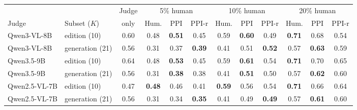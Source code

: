 \begin{tabular}{llc|ccc|ccc|ccc}
\toprule
 & & Judge & \multicolumn{3}{c|}{5\% human} & \multicolumn{3}{c|}{10\% human} & \multicolumn{3}{c}{20\% human}\\
Judge & Subset ($K$) & only & Hum. & PPI & PPI-r & Hum. & PPI & PPI-r & Hum. & PPI & PPI-r\\
\midrule
Qwen3-VL-8B & edition (10) & 0.60 & 0.48 & \textbf{0.51} & 0.45 & 0.59 & \textbf{0.60} & 0.49 & \textbf{0.71} & 0.68 & 0.54\\
Qwen3-VL-8B & generation (21) & 0.56 & 0.31 & 0.37 & \textbf{0.39} & 0.41 & 0.51 & \textbf{0.52} & 0.57 & \textbf{0.63} & 0.59\\
Qwen3.5-9B & edition (10) & 0.64 & 0.48 & \textbf{0.53} & 0.45 & 0.59 & \textbf{0.61} & 0.54 & \textbf{0.71} & 0.70 & 0.65\\
Qwen3.5-9B & generation (21) & 0.56 & 0.31 & \textbf{0.38} & 0.38 & 0.41 & \textbf{0.51} & 0.50 & 0.57 & \textbf{0.62} & 0.60\\
Qwen2.5-VL-7B & edition (10) & 0.47 & \textbf{0.48} & 0.46 & 0.41 & \textbf{0.59} & 0.56 & 0.54 & \textbf{0.71} & 0.66 & 0.64\\
Qwen2.5-VL-7B & generation (21) & 0.56 & 0.31 & 0.34 & \textbf{0.35} & 0.41 & 0.49 & \textbf{0.49} & 0.57 & \textbf{0.61} & 0.60\\
\bottomrule
\end{tabular}
